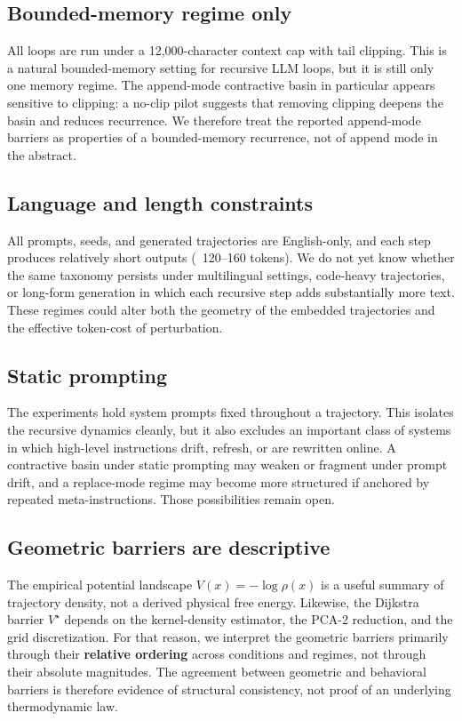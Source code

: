 \documentclass{article}
\theoremstyle{plain}
\theoremstyle{definition}
\begin{document}
\subsection{Bounded-memory regime only}

All loops are run under a 12,000-character context cap with tail
clipping. This is a natural bounded-memory setting for recursive LLM
loops, but it is still only one memory regime. The append-mode
contractive basin in particular appears sensitive to clipping: a
no-clip pilot suggests that removing clipping deepens the basin and
reduces recurrence. We therefore treat the reported append-mode
barriers as properties of a bounded-memory recurrence, not of append
mode in the abstract.

\subsection{Language and length constraints}

All prompts, seeds, and generated trajectories are English-only, and
each step produces relatively short outputs (~120–160 tokens). We do
not yet know whether the same taxonomy persists under multilingual
settings, code-heavy trajectories, or long-form generation in which
each recursive step adds substantially more text. These regimes could
alter both the geometry of the embedded trajectories and the
effective token-cost of perturbation.

\subsection{Static prompting}

The experiments hold system prompts fixed throughout a trajectory.
This isolates the recursive dynamics cleanly, but it also excludes
an important class of systems in which high-level instructions drift,
refresh, or are rewritten online. A contractive basin under static
prompting may weaken or fragment under prompt drift, and a
replace-mode regime may become more structured if anchored by
repeated meta-instructions. Those possibilities remain open.

\subsection{Geometric barriers are descriptive}

The empirical potential landscape $V(x) = -\log \rho(x)$ is a useful
summary of trajectory density, not a derived physical free energy.
Likewise, the Dijkstra barrier $V^\star$ depends on the
kernel-density estimator, the PCA-2 reduction, and the grid
discretization. For that reason, we interpret the geometric barriers
primarily through their \textbf{relative ordering} across conditions and
regimes, not through their absolute magnitudes. The agreement between
geometric and behavioral barriers is therefore evidence of structural
consistency, not proof of an underlying thermodynamic law.
\end{document}

